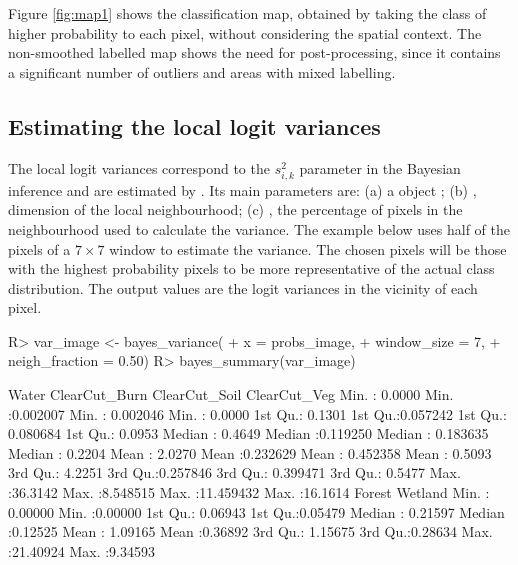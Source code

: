 \documentclass[
  shortnames]{jss}
\begin{document}
Figure \ref{fig:map1} shows the classification map, obtained by taking the class of higher probability to each pixel, without considering the spatial context. The non-smoothed labelled map shows the need for post-processing, since it contains a significant number of outliers and areas with mixed labelling.

\hypertarget{estimating-the-local-logit-variances}{%
\subsection{Estimating the local logit variances}\label{estimating-the-local-logit-variances}}

The local logit variances correspond to the \(s^2_{i,k}\) parameter in the Bayesian inference and are estimated by . Its main parameters are: (a) a  object ; (b) , dimension of the local neighbourhood; (c) , the percentage of pixels in the neighbourhood used to calculate the variance. The example below uses half of the pixels of a \(7\times 7\) window to estimate the variance. The chosen pixels will be those with the highest probability pixels to be more representative of the actual class distribution. The output values are the logit variances in the vicinity of each pixel.

\begin{CodeChunk}
\begin{CodeInput}
R> var_image <- bayes_variance(
+     x = probs_image,
+     window_size = 7,
+     neigh_fraction = 0.50)
R> bayes_summary(var_image)
\end{CodeInput}
\begin{CodeOutput}
 Water             ClearCut_Burn      ClearCut_Soil       ClearCut_Veg     
 Min.   : 0.0000   Min.   :0.002007   Min.   : 0.002046   Min.   : 0.0000  
 1st Qu.: 0.1301   1st Qu.:0.057242   1st Qu.: 0.080684   1st Qu.: 0.0953  
 Median : 0.4649   Median :0.119250   Median : 0.183635   Median : 0.2204  
 Mean   : 2.0270   Mean   :0.232629   Mean   : 0.452358   Mean   : 0.5093  
 3rd Qu.: 4.2251   3rd Qu.:0.257846   3rd Qu.: 0.399471   3rd Qu.: 0.5477  
 Max.   :36.3142   Max.   :8.548515   Max.   :11.459432   Max.   :16.1614  
 Forest             Wetland          
 Min.   : 0.00000   Min.   :0.00000  
 1st Qu.: 0.06943   1st Qu.:0.05479  
 Median : 0.21597   Median :0.12525  
 Mean   : 1.09165   Mean   :0.36892  
 3rd Qu.: 1.15675   3rd Qu.:0.28634  
 Max.   :21.40924   Max.   :9.34593  
\end{CodeOutput}
\end{CodeChunk}
\end{document}
